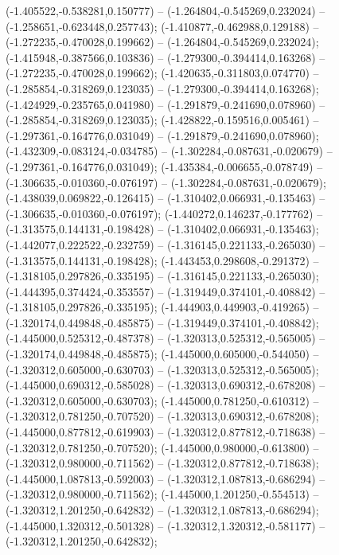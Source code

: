  (-1.405522,-0.538281,0.150777) -- (-1.264804,-0.545269,0.232024) -- (-1.258651,-0.623448,0.257743);
 (-1.410877,-0.462988,0.129188) -- (-1.272235,-0.470028,0.199662) -- (-1.264804,-0.545269,0.232024);
 (-1.415948,-0.387566,0.103836) -- (-1.279300,-0.394414,0.163268) -- (-1.272235,-0.470028,0.199662);
 (-1.420635,-0.311803,0.074770) -- (-1.285854,-0.318269,0.123035) -- (-1.279300,-0.394414,0.163268);
 (-1.424929,-0.235765,0.041980) -- (-1.291879,-0.241690,0.078960) -- (-1.285854,-0.318269,0.123035);
 (-1.428822,-0.159516,0.005461) -- (-1.297361,-0.164776,0.031049) -- (-1.291879,-0.241690,0.078960);
 (-1.432309,-0.083124,-0.034785) -- (-1.302284,-0.087631,-0.020679) -- (-1.297361,-0.164776,0.031049);
 (-1.435384,-0.006655,-0.078749) -- (-1.306635,-0.010360,-0.076197) -- (-1.302284,-0.087631,-0.020679);
 (-1.438039,0.069822,-0.126415) -- (-1.310402,0.066931,-0.135463) -- (-1.306635,-0.010360,-0.076197);
 (-1.440272,0.146237,-0.177762) -- (-1.313575,0.144131,-0.198428) -- (-1.310402,0.066931,-0.135463);
 (-1.442077,0.222522,-0.232759) -- (-1.316145,0.221133,-0.265030) -- (-1.313575,0.144131,-0.198428);
 (-1.443453,0.298608,-0.291372) -- (-1.318105,0.297826,-0.335195) -- (-1.316145,0.221133,-0.265030);
 (-1.444395,0.374424,-0.353557) -- (-1.319449,0.374101,-0.408842) -- (-1.318105,0.297826,-0.335195);
 (-1.444903,0.449903,-0.419265) -- (-1.320174,0.449848,-0.485875) -- (-1.319449,0.374101,-0.408842);
 (-1.445000,0.525312,-0.487378) -- (-1.320313,0.525312,-0.565005) -- (-1.320174,0.449848,-0.485875);
 (-1.445000,0.605000,-0.544050) -- (-1.320312,0.605000,-0.630703) -- (-1.320313,0.525312,-0.565005);
 (-1.445000,0.690312,-0.585028) -- (-1.320313,0.690312,-0.678208) -- (-1.320312,0.605000,-0.630703);
 (-1.445000,0.781250,-0.610312) -- (-1.320312,0.781250,-0.707520) -- (-1.320313,0.690312,-0.678208);
 (-1.445000,0.877812,-0.619903) -- (-1.320312,0.877812,-0.718638) -- (-1.320312,0.781250,-0.707520);
 (-1.445000,0.980000,-0.613800) -- (-1.320312,0.980000,-0.711562) -- (-1.320312,0.877812,-0.718638);
 (-1.445000,1.087813,-0.592003) -- (-1.320312,1.087813,-0.686294) -- (-1.320312,0.980000,-0.711562);
 (-1.445000,1.201250,-0.554513) -- (-1.320312,1.201250,-0.642832) -- (-1.320312,1.087813,-0.686294);
 (-1.445000,1.320312,-0.501328) -- (-1.320312,1.320312,-0.581177) -- (-1.320312,1.201250,-0.642832);
